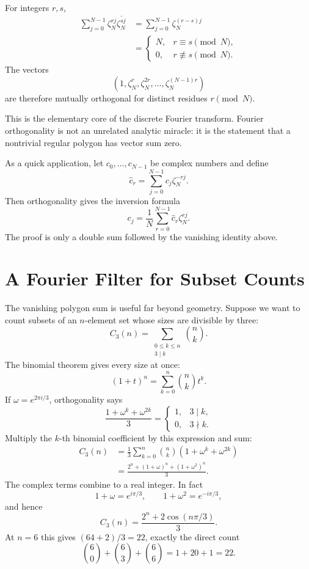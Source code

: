 For integers \(r,s\),
\[
\begin{aligned}
\sum_{j=0}^{N-1}
\zeta_N^{rj}\overline{\zeta_N^{sj}}
&=\sum_{j=0}^{N-1}\zeta_N^{(r-s)j}\\
&=
\begin{cases}
N,&r\equiv s\pmod N,\\
0,&r\not\equiv s\pmod N.
\end{cases}
\end{aligned}
\]
The vectors
\[
  (1,\zeta_N^r,\zeta_N^{2r},\ldots,\zeta_N^{(N-1)r})
\]
are therefore mutually orthogonal for distinct residues \(r\pmod N\).

This is the elementary core of the discrete Fourier transform.  Fourier orthogonality is not an unrelated analytic miracle: it is the statement that a nontrivial regular polygon has vector sum zero.

As a quick application, let \(c_0,\ldots,c_{N-1}\) be complex numbers and define
\[
  \widehat c_r
  =\sum_{j=0}^{N-1}c_j\zeta_N^{-rj}.
\]
Then orthogonality gives the inversion formula
\[
  c_j=\frac1N\sum_{r=0}^{N-1}\widehat c_r\zeta_N^{rj}.
\]
The proof is only a double sum followed by the vanishing identity above.

\section{A Fourier Filter for Subset Counts}

The vanishing polygon sum is useful far beyond geometry. Suppose we want to count subsets of an $n$-element set whose sizes are divisible by three:
\[
 C_3(n)=\sum_{\substack{0\le k\le n\\3\mid k}}\binom nk.
\]
The binomial theorem gives every size at once:
\[
 (1+t)^n=\sum_{k=0}^n\binom nk t^k.
\]
If $\omega=e^{2\pi i/3}$, orthogonality says
\[
 \frac{1+\omega^k+\omega^{2k}}3
 =\begin{cases}1,&3\mid k,\\0,&3\nmid k.\end{cases}
\]
Multiply the $k$-th binomial coefficient by this expression and sum:
\[
 \begin{aligned}
 C_3(n)
 &=\frac13\sum_{k=0}^n
       \binom nk(1+\omega^k+\omega^{2k})\\
 &=\boxed{\frac{2^n+(1+\omega)^n+(1+\omega^2)^n}{3}.}
 \end{aligned}
\]
The complex terms combine to a real integer. In fact
\[
 1+\omega=e^{i\pi/3},\qquad
 1+\omega^2=e^{-i\pi/3},
\]
and hence
\[
 \boxed{C_3(n)=\frac{2^n+2\cos(n\pi/3)}3.}
\]
At $n=6$ this gives $(64+2)/3=22$, exactly the direct count
\[
 \binom60+\binom63+\binom66=1+20+1=22.
\]

